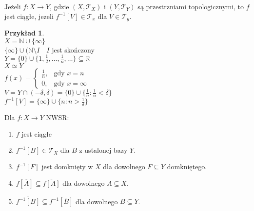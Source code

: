 \documentclass[twoside,10pt]{article}
\theoremstyle{definition}
\theoremstyle{definition}
\theoremstyle{definition}
\theoremstyle{definition}
\theoremstyle{remark}
\theoremstyle{definition}
\theoremstyle{definition}
\theoremstyle{definition}
\theoremstyle{definition}
\newtheorem*{prz}{Przykład}
\theoremstyle{definition}
\theoremstyle{definition}
\begin{document}
\begin{df} 
    Jeżeli $f: X \to Y$, gdzie $(X,\mathcal T _X)$ i $(Y,\mathcal T_Y)$ są przestrzniami topologicznymi, to 
    $f$ jest ciągłe, jezeli $f^{-1}[V] \in \mathcal T_x$ dla $V \in \mathcal T_y$.
\end{df} 
\begin{prz} ~\\ 
    $X = \mathbb N \cup \{\infty\}$ \\ 
    $\{ \infty \} \cup (\mathbb N \setminus I \quad I$ jest skończony \\
    $Y = \{0\} \cup \{1,\frac{1}{2},\ldots,\frac{1}{n},\ldots\} \subseteq \mathbb R$ \\ 
    $X \simeq Y$ \\ 
    $f(x) = \begin{cases} \frac{1}{n}, &\text{gdy } x = n \\ 0, &\text{gdy }  x = \infty \end{cases}$\\
    $V = Y \cap (-\delta,\delta) = \{0\} \cup \{\frac{1}{n}: \frac{1}{n} < \delta\}$ \\ 
    $f^{-1}[V] = \{\infty\} \cup \{n: n > \frac{1}{\delta}\}$
\end{prz}
\begin{tw} 
    Dla $f: X \to Y$ NWSR: 
    \begin{enumerate}[(1)]
        \item $f$ jest ciągłe
        \item $f^{-1} [B] \in \mathcal T_X$ dla $B$ z ustalonej bazy $Y$.
        \item $f^{-1} [F]$ jest domknięty w $X$ dla dowolnego $F \subseteq Y$ domkniętego. 
        \item $f[\overline A] \subseteq \overline{f[A]}$ dla dowolnego $A \subseteq X$.
        \item $\overline{f^{-1}[B]} \subseteq f^{-1}[\overline B]$ dla dowolnego $B \subseteq Y$. 
    \end{enumerate} 
\end{tw} 
\end{document}
